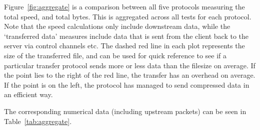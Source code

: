 \documentclass{sig-alternate-05-2015}
\begin{document}
Figure~\ref{fig:aggregate} is a comparison between all five protocols measuring the total speed, and total bytes. This is aggregated across all tests for each protocol. Note that the speed calculations only include downstream data, while the `transferred data' measures include data that is sent from the client back to the server via control channels etc. The dashed red line in each plot represents the size of the transferred file, and can be used for quick reference to see if a particular transfer protocol sends more or less data than the filesize on average. If the point lies to the right of the red line, the transfer has an overhead on average. If the point is on the left, the protocol has managed to send compressed data in an efficient way.

The corresponding numerical data (including upstream packets) can be seen in Table~\ref{tab:aggregate}.
\end{document}
